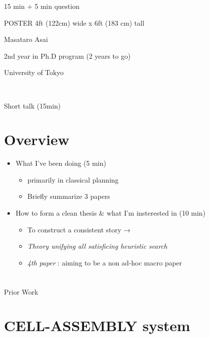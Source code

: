 \begin{outline-text-1}
15 min + 5 min question

POSTER 4ft (122cm) wide x 6ft (183 cm) tall

\begin{larger}
\begin{center}
Masataro Asai

2nd year in Ph.D program (2 years to go)

University of Tokyo

　

Short talk (15min)
\end{center}
\end{larger}
\end{outline-text-1}

\section{Overview}
\label{sec-1}

\begin{itemize}
\item What I've been doing (5 min)
\begin{itemize}
\item primarily in classical planning
\item Briefly summarize 3 papers
\end{itemize}
\item How to form a clean thesis \& what I'm insterested in (10 min)
\begin{itemize}
\item To construct a consistent story →
\item \emph{Theory unifying all satisficing heuristic search}
\item \emph{4th paper} : aiming to be a non ad-hoc macro paper
\end{itemize}
\end{itemize}

\section{}
\label{sec-2}

\begin{xlarge}
\begin{center}
Prior Work
\end{center}
\end{xlarge}

\section{CELL-ASSEMBLY system}
\label{sec-3}

